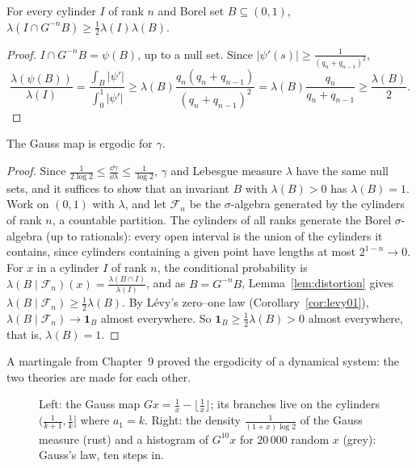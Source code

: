 \begin{lemma}\label{lem:distortion}
For every cylinder $I$ of rank $n$ and Borel set $B\subseteq(0,1)$, $\lambda(I\cap G^{-n}B)\ge\frac12\lambda(I)\lambda(B)$.
\end{lemma}
\begin{proof}
$I\cap G^{-n}B=\psi(B)$, up to a null set. Since $|\psi'(s)|\ge\frac1{(q_n+q_{n-1})^2}$,
\[
\frac{\lambda(\psi(B))}{\lambda(I)}=\frac{\int_B|\psi'|}{\int_0^1|\psi'|}\ge\lambda(B)\frac{q_n(q_n+q_{n-1})}{(q_n+q_{n-1})^2}=\lambda(B)\frac{q_n}{q_n+q_{n-1}}\ge\frac{\lambda(B)}2.
\]
\end{proof}

\begin{theorem}\label{thm:gaussergodic}
The Gauss map is ergodic for $\gamma$.
\end{theorem}
\begin{proof}
Since $\frac1{2\log2}\le\frac{\dd\gamma}{\dd\lambda}\le\frac1{\log2}$, $\gamma$ and Lebesgue measure $\lambda$ have the same null sets, and it suffices to show that an invariant $B$ with $\lambda(B)>0$ has $\lambda(B)=1$. Work on $(0,1)$ with $\lambda$, and let $\mathcal F_n$ be the
$\sigma$-algebra generated by the cylinders of rank $n$, a countable partition. The cylinders of all ranks generate the Borel $\sigma$-algebra (up to rationals): every open interval is the union of the cylinders it
contains, since cylinders containing a given point have lengths at most $2^{1-n}\to0$. For $x$ in a cylinder $I$ of rank $n$, the conditional probability is $\lambda(B\mid\mathcal F_n)(x)=\frac{\lambda(B\cap I)}{\lambda(I)}$, and as $B=G^{-n}B$,
Lemma~\ref{lem:distortion} gives $\lambda(B\mid\mathcal F_n)\ge\frac12\lambda(B)$. By L\'evy's zero--one law (Corollary~\ref{cor:levy01}), $\lambda(B\mid\mathcal F_n)\to\mathbf 1_B$ almost everywhere. So $\mathbf 1_B\ge\frac12\lambda(B)>0$ almost everywhere,
that is, $\lambda(B)=1$.
\end{proof}

A martingale from Chapter~9 proved the ergodicity of a dynamical system: the two theories are made for each other.

\begin{figure}[ht]
\centering{}
\caption{Left: the Gauss map $Gx=\frac1x-\lfloor\frac1x\rfloor$; its branches live on the cylinders $(\frac1{k+1},\frac1k]$ where $a_1=k$. Right: the density $\frac1{(1+x)\log2}$ of the Gauss measure (rust) and a histogram of
$G^{10}x$ for $20\,000$ random $x$ (grey): Gauss's law, ten steps in.}
\label{fig:gaussmap}
\end{figure}

